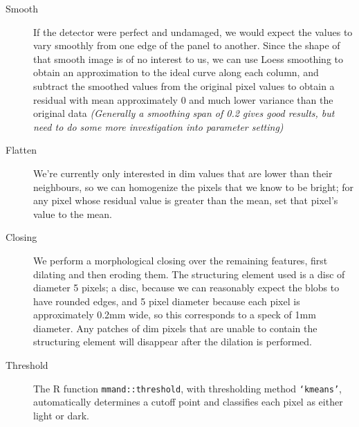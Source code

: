 \documentclass[10pt,fleqn]{article}
\begin{document}
\begin{description}		%

\item[Smooth] If the detector were perfect and undamaged, we would expect the values to vary smoothly from one edge of the panel to another. Since the shape of that smooth image is of no interest to us, we can use Loess smoothing to obtain an approximation to the ideal curve along each column, and subtract the smoothed values from the original pixel values to obtain a residual with mean approximately 0 and much lower variance than the original data \textit{(Generally a smoothing span of 0.2 gives good results, but need to do some more investigation into parameter setting)}

\item[Flatten] We're currently only interested in dim values that are lower than their neighbours, so we can homogenize the pixels that we know to be bright; for any pixel whose residual value is greater than the mean, set that pixel's value to the mean.

\item[Closing] We perform a morphological closing over the remaining features, first dilating and then eroding them. The structuring element used is a disc of diameter 5 pixels; a disc, because we can reasonably expect the blobs to have rounded edges, and 5 pixel diameter because each pixel is approximately 0.2mm wide, so this corresponds to a speck of 1mm diameter. Any patches of dim pixels that are unable to contain the structuring element will disappear after the dilation is performed. 

\item[Threshold] The R function \texttt{mmand::threshold}, with thresholding method \texttt{`kmeans'}, automatically determines a cutoff point and classifies each pixel as either light or dark.

\end{description}
\end{document}
